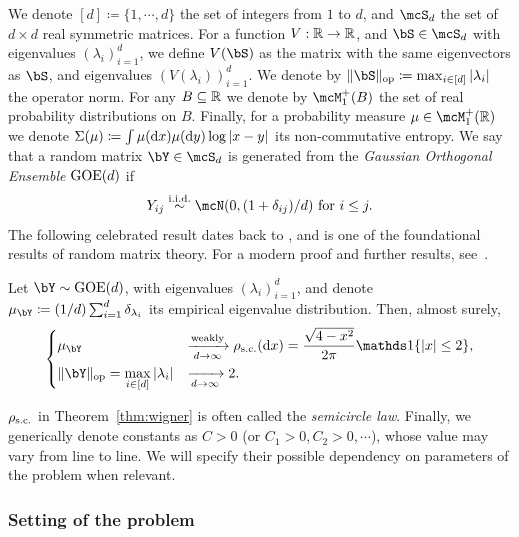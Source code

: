 We denote $[d] \coloneqq \{1, \cdots, d\}$ the set of integers from $1$ to $d$,
and $\mcS_d$ the set of $d \times d$ real symmetric matrices.
For a function $V : \mathbb{R} \to \mathbb{R}$, and $\bS \in \mcS_d$ with eigenvalues $(\lambda_i)_{i=1}^d$, we define $V(\bS)$ as the matrix with the same eigenvectors as $\bS$,
and eigenvalues $(V(\lambda_i))_{i=1}^d$. 
We denote by $\|\bS\|_{\op} \coloneqq \max_{i \in [d]}|\lambda_i|$ the operator norm.
For any $B \subseteq \mathbb{R}$ we denote by $\mcM_1^+(B)$ the set of real probability distributions on $B$.
Finally, for a probability measure $\mu \in \mcM_1^+(\bbR)$ we denote $\Sigma(\mu) \coloneqq \int \mu(\mathrm{d} x) \mu(\mathrm{d} y) \log |x - y|$ its non-commutative entropy.
We say that a random matrix $\bY \in \mcS_d$ is generated from the \emph{Gaussian Orthogonal Ensemble} $\mathrm{GOE}(d)$ if
\begin{equation*}
    Y_{ij} \iid \mcN(0, (1+\delta_{ij})/d) \textrm{ for } i \leq j.
\end{equation*}
The following celebrated result dates back to \cite{wigner1955characteristic}, and is one of the foundational results of random matrix theory. 
For a modern proof and further results, see~\cite{anderson2010introduction}.
\begin{theorem}\label{thm:wigner}
    Let $\bY \sim \GOE(d)$, with eigenvalues $(\lambda_i)_{i=1}^d$, and denote $\mu_\bY \coloneqq (1/d) \sum_{i=1}^d \delta_{\lambda_i}$ its empirical eigenvalue distribution.
    Then, almost surely,
    \begin{equation*}
        \begin{dcases}
            \mu_\bY &\xrightarrow[d \to \infty]{\textrm{weakly}} \rho_{\sci}(\rd x) = \frac{\sqrt{4-x^2}}{2\pi} \indi\{|x| \leq 2\}, \\
            \|\bY\|_\op = \max_{i \in [d]} |\lambda_i| &\xrightarrow[d \to \infty]{} 2.
        \end{dcases}
    \end{equation*}
\end{theorem}
\noindent
$\rho_{\mathrm{s.c.}}$ in Theorem~\ref{thm:wigner} is often called the \emph{semicircle law}.
Finally, we generically denote constants as $C > 0$ (or $C_1 > 0, C_2 > 0, \cdots$), whose value may vary from line to line.
We will specify their possible dependency on parameters of the problem when relevant.

\subsubsection{Setting of the problem} 

